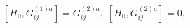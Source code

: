 \begin{equation}
\left[ H_{0},G_{ij}^{(1)a}\right] =G_{ij}^{(2)a},\;\left[
H_{0},G_{ij}^{(2)a}\right] =0,  \label{f13}
\end{equation}

